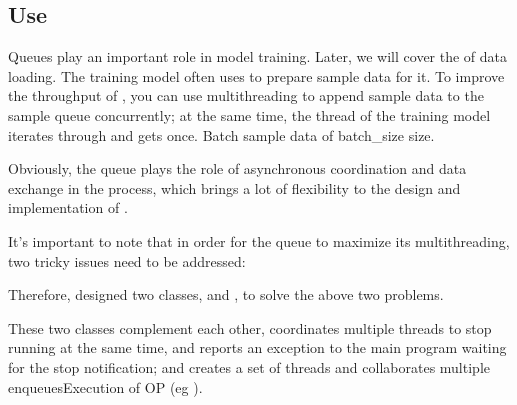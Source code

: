 \begin{content}
\subsection{Use}
Queues play an important role in model training. Later, we will cover the  of data loading. The training model often uses  to prepare sample data for it. To improve the throughput of , you can use multithreading to append sample data to the sample queue concurrently; at the same time, the thread of the training model iterates through  and gets \code once. Batch sample data of {batch\_size} size.

Obviously, the queue plays the role of asynchronous coordination and data exchange in the  process, which brings a lot of flexibility to the design and implementation of .

It's important to note that in order for the queue to maximize its multithreading, two tricky issues need to be addressed:

\begin{enum}
\end{enum}

Therefore,  designed two classes,  and , to solve the above two problems.

These two classes complement each other,  coordinates multiple threads to stop running at the same time, and reports an exception to the main program waiting for the stop notification; and  creates a set of threads and collaborates multiple enqueues\ascii Execution of {OP} (eg ).

\end{content}


